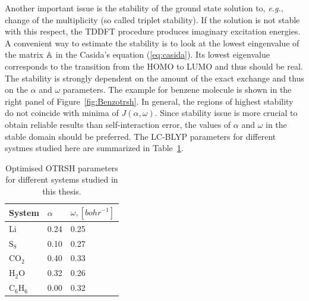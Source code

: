Another important issue is the stability of the ground state solution to, \textit{e.g.}, change of the multiplicity (so called triplet stability). 
If the solution is not stable with this respect, the TDDFT procedure produces imaginary excitation energies.
A convenient way to estimate the stability is to look at the lowest eingenvalue of the 
matrix $\mathbb{A}$ in the Casida's equation (\ref{eq:casida}).
Its lowest eigenvalue corresponds to the transition from the HOMO to LUMO and thus should be real.
The stability is strongly dependent on the amount of the exact exchange and thus on the $\alpha$ and $\omega$ parameters.
The example for benzene molecule is shown in the right panel of Figure~\ref{fig:Benzotrsh}.
In general, the regions of highest stability do not coincide with minima of $J(\alpha,\omega)$.
Since stability issue is more crucial to obtain reliable results than self-interaction error, the values of $\alpha$ and $\omega$ in the stable domain should be preferred.
The LC-BLYP parameters for different systmes studied here are summarized in Table~\ref{tab:params}.

\begin{table}[h]
\begin{center}
\begin{tabular}{|l|l|l|}
\hline
System & $\alpha$ & $\omega, [bohr^{-1}]$\\
\hline
Li & 0.24 & 0.25 \\
\hline
S$_8$ & 0.10 & 0.27 \\
\hline
CO$_2$ & 0.40 & 0.33 \\
\hline
H$_2$O & 0.32 & 0.26 \\
\hline
C$_6$H$_6$ & 0.00 & 0.32 \\
\hline
\end{tabular}
\end{center}
\caption{Optimised OTRSH parameters for different systems studied in this thesis.}
\label{tab:params}
\end{table}

